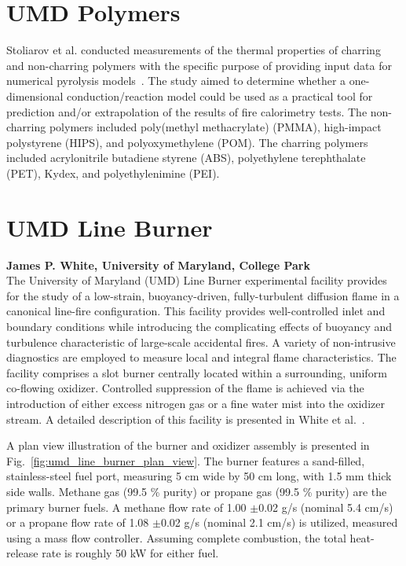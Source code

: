\section{UMD Polymers}

Stoliarov et al. conducted measurements of the thermal properties of charring and non-charring polymers with the specific purpose of providing input data for numerical pyrolysis models~\cite{Li:IJHMT,Li:CF,Li:PDS_2014,Li:PDS_2015}. The study aimed to determine whether a one-dimensional conduction/reaction model could be used as a practical tool for prediction and/or extrapolation of the results of fire calorimetry tests. The non-charring polymers included poly(methyl methacrylate) (PMMA), high-impact polystyrene (HIPS), and polyoxymethylene (POM). The charring polymers included acrylonitrile butadiene styrene (ABS), polyethylene terephthalate (PET), Kydex, and polyethylenimine (PEI).


\section{UMD Line Burner}

{\bf James P. White, University of Maryland, College Park}\\

\noindent The University of Maryland (UMD) Line Burner experimental facility provides for the study of a low-strain, buoyancy-driven, fully-turbulent diffusion flame in a canonical line-fire configuration. This facility provides well-controlled inlet and boundary conditions while introducing the complicating effects of buoyancy and turbulence characteristic of large-scale accidental fires. A variety of non-intrusive diagnostics are employed to measure local and integral flame characteristics. The facility comprises a slot burner centrally located within a surrounding, uniform co-flowing oxidizer. Controlled suppression of the flame is achieved via the introduction of either excess nitrogen gas or a fine water mist into the oxidizer stream. A detailed description of this facility is presented in White et al.~\cite{White:2015}.

A plan view illustration of the burner and oxidizer assembly is presented in Fig.~\ref{fig:umd_line_burner_plan_view}.  The burner features a sand-filled, stainless-steel fuel port, measuring 5 cm wide by 50 cm long, with 1.5 mm thick side walls. Methane gas (99.5 \% purity) or propane gas (99.5 \% purity) are the primary burner fuels. A methane flow rate of 1.00 $\pm$0.02 g/s (nominal 5.4 cm/s) or a propane flow rate of 1.08 $\pm$0.02 g/s (nominal 2.1 cm/s) is utilized, measured using a mass flow controller. Assuming complete combustion, the total heat-release rate is roughly 50 kW for either fuel.

